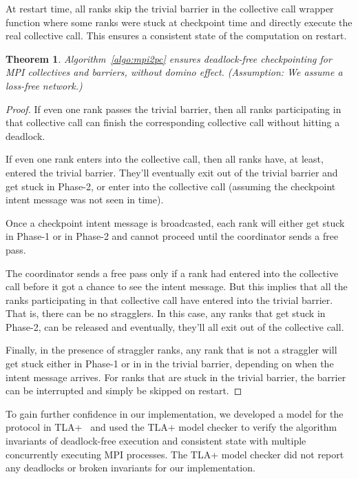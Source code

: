 \documentclass[11pt,letter]{article}
\newtheorem{theorem}{Theorem}
\begin{document}
 At restart time, all ranks skip the trivial barrier in the collective call
 wrapper function where some ranks were stuck at checkpoint time and directly
 execute the real collective call. This ensures a consistent state of the
 computation on restart.

\begin{theorem}
  Algorithm~\ref{algo:mpi2pc} ensures deadlock-free checkpointing for MPI
  collectives and barriers, without domino effect.
  (Assumption: We assume a loss-free network.)
\end{theorem}

\begin{proof}
  If even one rank passes the trivial barrier, then all ranks
  participating in that collective call can finish the corresponding
  collective call without hitting a deadlock.

  If even one rank enters into the collective call, then all ranks have,
  at least, entered the trivial barrier. They'll eventually exit out of the
  trivial barrier and get stuck in Phase-2, or enter into the collective call
  (assuming the checkpoint intent message was not seen in time).

  Once a checkpoint intent message is broadcasted, each rank will either get
  stuck in Phase-1 or in Phase-2 and cannot proceed until the coordinator
  sends a free pass.

  The coordinator sends a free pass only if a rank had entered into the
  collective call before it got a chance to see the intent message. But this
  implies that all the ranks participating in that collective call have entered
  into the trivial barrier. That is, there can be no stragglers. In this case,
  any ranks that get stuck in Phase-2, can be released and eventually, they'll
  all exit out of the collective call.

  Finally, in the presence of straggler ranks, any rank that is not a straggler
  will get stuck either in Phase-1 or in in the trivial barrier, depending on
  when the intent message arrives. For ranks that are stuck in the trivial
  barrier, the barrier can be interrupted and simply be skipped on restart.
\end{proof}

To gain further confidence in our implementation, we developed a model for the
protocol in TLA+~\cite{lamport1999tla} and used the TLA+ model checker to
verify the algorithm invariants of deadlock-free execution and consistent
state with multiple concurrently executing MPI processes. The TLA+ model checker
did not report any deadlocks or broken invariants for our implementation.



\end{document}
